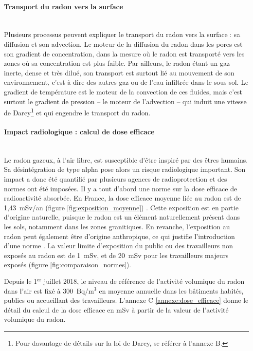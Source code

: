 \documentclass{article}
\begin{document}
\paragraph{Transport du radon vers la surface \\ \\} Plusieurs processus peuvent expliquer le transport du radon vers la surface \cite{irsn_ineris_radon_nodate} : sa diffusion et son advection. Le moteur de la diffusion du radon dans les pores est son gradient de concentration, dans la mesure où le radon est transporté vers les zones où sa concentration est plus faible. Par ailleurs, le radon étant un gaz inerte, dense et très dilué, son transport est surtout lié au mouvement de son environnement, c’est-à-dire des autres gaz ou de l’eau infiltrée dans le sous-sol. Le gradient de température est le moteur de la convection de ces fluides, mais c’est surtout le gradient de pression -- le moteur de l’advection -- qui induit une vitesse de Darcy\footnote{Pour davantage de détails sur la loi de Darcy, se référer à l'annexe B.} et qui engendre le transport du radon.

\paragraph{Impact radiologique : calcul de dose efficace \\ \\} Le radon gazeux, à l’air libre, est susceptible d’être inspiré par des êtres humains. Sa désintégration de type alpha pose alors un risque radiologique important. Son impact a donc été quantifié par plusieurs agences de radioprotection et des normes ont été imposées. Il y a tout d’abord une norme sur la dose efficace de radioactivité absorbée. En France, la dose efficace moyenne liée au radon est de 1,43~mSv/an (figure \ref{fig:exposition_moyenne}) \cite{irsn_quelle_nodate}. Cette exposition est en partie d’origine naturelle, puisque le radon est un élément naturellement présent dans les sols, notamment dans les zones granitiques. En revanche, l’exposition au radon peut également être d’origine anthropique, ce qui justifie l'introduction d'une norme \cite{inrs_rayonnements_nodate}. La valeur limite d’exposition du public ou des travailleurs non exposés au radon est de 1~mSv, et de 20~mSv pour les travailleurs majeurs exposés (figure \ref{fig:comparaison_normes}).

Depuis le 1$^{\text{er}}$ juillet 2018, le niveau de référence de l’activité volumique du radon dans l'air est fixé à 300~Bq/m$^3$ en moyenne annuelle \cite{autorite_de_surete_nucleaire_reglementation_nodate} dans les bâtiments habités, publics ou accueillant des travailleurs. L'annexe C \ref{annexe:dose_efficace} donne le détail du calcul de la dose efficace en mSv à partir de la valeur de l'activité volumique du radon.
\end{document}
